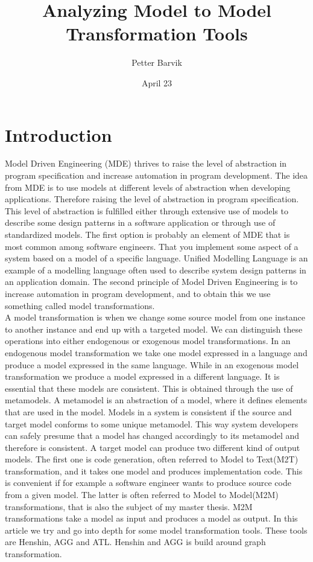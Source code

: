 \documentclass[pdftex,11pt,a4paper]{article}
\begin{document}
\title{Analyzing Model to Model Transformation
	   Tools}
\date{April 23}
\author{Petter Barvik}

\maketitle

\abstract{}

\newpage
\section{Introduction}

\noindent Model Driven Engineering (MDE)\cite{France2007} thrives to raise the
level of abstraction in program specification and increase automation in program development. The idea
from MDE is to use models at different levels of abstraction when developing
applications. Therefore raising the level of abstraction in program
specification. This level of abstraction is fulfilled either through extensive
use of models to describe some design patterns in a software application or
through use of standardized models. The first option is probably an element of
MDE that is most common among software engineers. That you implement some aspect
of a system based on a model of a specific language. Unified Modelling Language is
an example of a modelling language often used to describe system design
patterns in an application domain. The second principle of Model Driven
Engineering is to increase automation in program development, and to obtain this
we use something called model transformations. \\
\indent A model transformation is when we change some source model from one
instance to another instance and end up with a targeted model. We can
distinguish these operations into either endogenous or exogenous model
transformations. In an endogenous model transformation we take one model
expressed in a language and produce a model expressed in the same language.
While in an exogenous model transformation we produce a model expressed in a
different language. It is essential that these models are consistent. This is
obtained through the use of metamodels. A metamodel is an abstraction of a
model, where it defines elements that are used in the model. Models in a
system is consistent if the source and target model conforms to some unique 
metamodel. This way system developers can safely presume that a model has
changed accordingly to its metamodel and therefore is consistent. A target model
can produce two different kind of output models. The first one is code
generation, often referred to Model to Text(M2T) transformation, and it takes
one model and produces implementation code. This is convenient if for example a software
engineer wants to produce source code from a given model. The latter is often
referred to Model to Model(M2M) transformations, that is also the subject of
my master thesis. M2M transformations take a model as input and produces a model
as output. In this article we try and go into depth for some model
transformation tools. These tools are Henshin\cite{Henshin}, AGG\cite{AGG} and
ATL\cite{ATL}. Henshin and AGG is build around graph transformation. 
\end{document}
